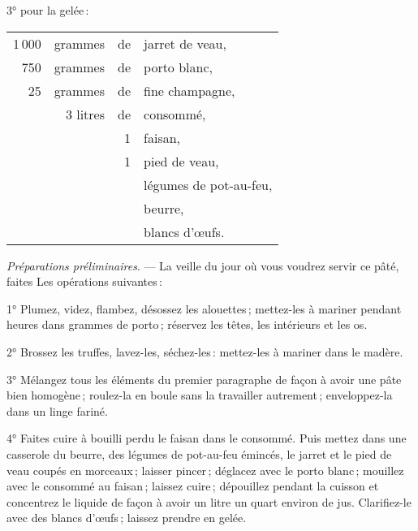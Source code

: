 3° pour la gelée :

\footnotesize
\begin{longtable}{rrrp{16em}}
  1 000 &  grammes & de & jarret de veau,                                                                 \\
    750 &  grammes & de & porto blanc,                                                                    \\
     25 &  grammes & de & fine champagne,                                                                 \\
        & 3 litres & de & consommé,                                                                       \\
        &          &  1 & faisan,                                                                         \\
        &          &  1 & pied de veau,                                                                   \\
        &          &    & légumes de pot-au-feu,                                                          \\
        &          &    & beurre,                                                                         \\
        &          &    & blancs d'œufs.                                                                  \\
\end{longtable}
\normalsize

\textit{Préparations préliminaires}. — La veille du jour où vous voudrez servir
ce pâté, faites Les opérations suivantes :

1° Plumez, videz, flambez, désossez les alouettes ; mettez-les à mariner
pendant {\mmm} heures dans {\mmm} grammes de porto ; réservez les
têtes, les intérieurs et les os.

2° Brossez les truffes, lavez-les, séchez-les : mettez-les à mariner dans le
madère.

3° Mélangez tous les éléments du premier paragraphe de façon à avoir une pâte
bien homogène ; roulez-la en boule sans la travailler autrement ; enveloppez-la
dans un linge fariné.

4° Faites cuire à bouilli perdu le faisan dans le consommé. Puis mettez dans
une casserole du beurre, des légumes de pot-au-feu émincés, le jarret et le
pied de veau coupés en morceaux ; laisser pincer ; déglacez avec le porto
blanc ; mouillez avec le consommé au faisan ; laissez cuire ; dépouillez
pendant la cuisson et concentrez le liquide de façon à avoir un litre un quart
environ de jus. Clarifiez-le avec des blancs d'œufs ; laissez prendre en gelée.


